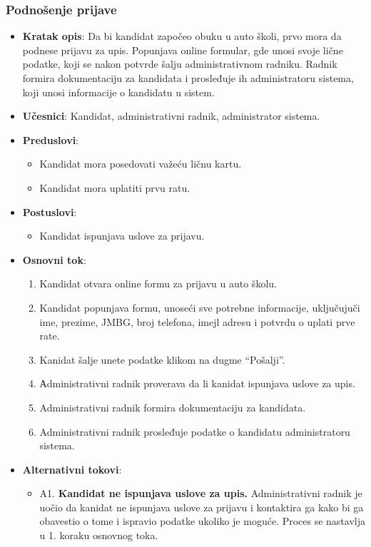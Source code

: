 \subsubsection{Podnošenje prijave}
\label{subsubsec:prijava}
\begin{itemize}
  \item \textbf{Kratak opis}: Da bi kandidat započeo obuku u auto školi, prvo mora da podnese prijavu za upis. Popunjava online formular, gde unosi svoje lične podatke, koji se nakon potvrde šalju administrativnom radniku. Radnik formira dokumentaciju za kandidata i prosleđuje ih administratoru sistema, koji unosi informacije o kandidatu u sistem.
  \item \textbf{Učesnici}: Kandidat, administrativni radnik, administrator sistema.
  \item \textbf{Preduslovi}:
    \begin{itemize}
    \item Kandidat mora posedovati važeću ličnu kartu.
    \item Kandidat mora uplatiti prvu ratu.
    \end{itemize}
  \item \textbf{Postuslovi}:
      \begin{itemize}
      \item Kandidat ispunjava uslove za prijavu.
      \end{itemize}
  \item \textbf{Osnovni tok}:
      \begin{enumerate}
        \item Kandidat otvara online formu za prijavu u auto školu.
        \item Kandidat popunjava formu, unoseći sve potrebne informacije, uključujuči ime, prezime, JMBG, broj telefona, imejl adresu i potvrdu o uplati prve rate.
        \item Kanidat šalje unete podatke klikom na dugme “Pošalji”.
        \item Аdministrativni radnik proverava da li kanidat ispunjava uslove za upis.
        \item Administrativni radnik formira dokumentaciju za kandidata.
        \item Administrativni radnik prosleđuje podatke o kandidatu administratoru sistema.
      \end{enumerate}

  \item \textbf{Alternativni tokovi}:
      \begin{itemize}
        \item A1. \textbf{Kandidat ne ispunjava uslove za upis.}
        Administrativni radnik je uočio da kanidat ne ispunjava uslove za prijavu i kontaktira ga kako bi ga obavestio o tome i ispravio podatke ukoliko je moguće. Proces se nastavlja u 1. koraku osnovnog toka.
      \end{itemize}
\end{itemize}



